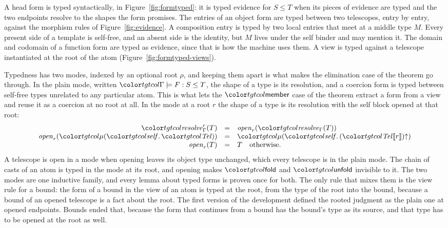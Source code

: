A head form is typed syntactically, in Figure~\ref{fig:formtyped}: it is typed evidence for $S \le T$ when its pieces of evidence are typed and the two endpoints resolve to the shapes the form promises. The entries of an object form are typed between two telescopes, entry by entry, against the morphism rules of Figure~\ref{fig:evidence}. A composition entry is typed by two local entries that meet at a middle type $M$. Every present side of a template is self-free, and an absent side is the identity, but $M$ lives under the self binder and may mention it. The domain and codomain of a function form are typed as evidence, since that is how the machine uses them. A view is typed against a telescope instantiated at the root of the atom (Figure~\ref{fig:formtyped-views}).

Typedness has two modes, indexed by an optional root $\rho$, and keeping them apart is what makes the elimination case of the theorem go through. In the plain mode, written $\formj{\Gamma}{F}{S}{T}$, the shape of a type is its resolution, and a coercion form is typed between self-free types unrelated to any particular atom. This is what lets the $\ev{member}$ case of the theorem extract a form from a view and reuse it as a coercion at no root at all. In the mode at a root $r$ the shape of a type is its resolution with the self block opened at that root:
\[
\begin{array}{@{}rcl@{}}
\resolveAt{\Gamma}{r}{T} & = & \mathit{open}_r(\resolve{\Gamma}{T}) \\
\mathit{open}_r(\obj{\tel}) & = & \obj{\weak{(\inst{\tel}{r})}} \\
\mathit{open}_r(T) & = & T \quad \text{otherwise} .
\end{array}
\]
A telescope is open in a mode when opening leaves its object type unchanged, which every telescope is in the plain mode. The chain of casts of an atom is typed in the mode at its root, and opening makes $\ev{fold}$ and $\ev{unfold}$ invisible to it. The two modes are one inductive family, and every lemma about typed forms is proven once for both. The only rule that mixes them is the view rule for a bound: the form of a bound in the view of an atom is typed at the root, from the type of the root into the bound, because a bound of an opened telescope is a fact about the root. The first version of the development defined the rooted judgment as the plain one at opened endpoints. Bounds ended that, because the form that continues from a bound has the bound's type as its source, and that type has to be opened at the root as well.

